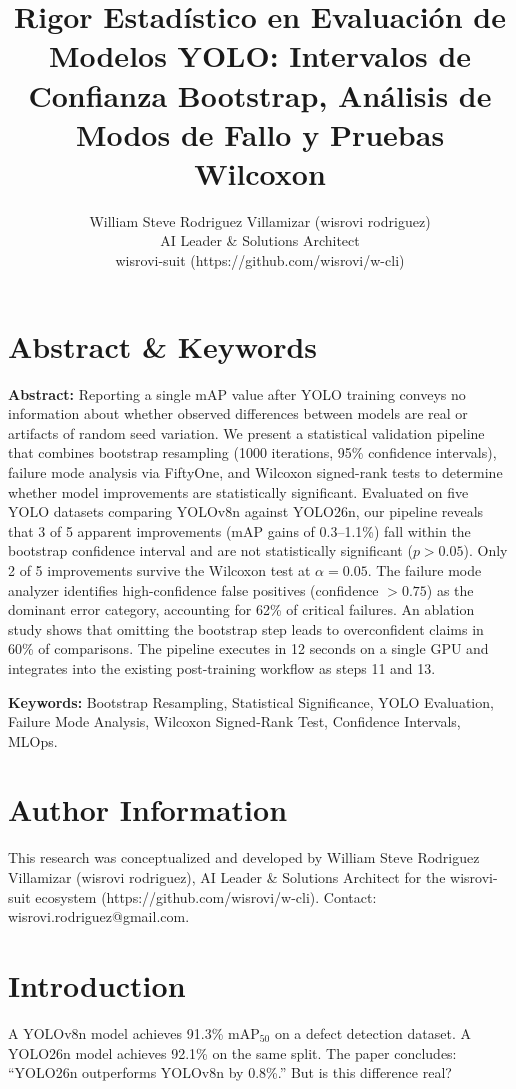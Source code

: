 \documentclass[10pt,twocolumn,letterpaper]{article}
\title{Rigor Estadístico en Evaluación de Modelos YOLO: Intervalos de Confianza Bootstrap, Análisis de Modos de Fallo y Pruebas Wilcoxon}
\author{William Steve Rodriguez Villamizar (wisrovi rodriguez)\\AI Leader \& Solutions Architect\\wisrovi-suit (https://github.com/wisrovi/w-cli)}
\date{}
\begin{document}
\maketitle

\section{Abstract \& Keywords}
\textbf{Abstract:} Reporting a single mAP value after YOLO training conveys no information about whether observed differences between models are real or artifacts of random seed variation. We present a statistical validation pipeline that combines bootstrap resampling (1000 iterations, 95\% confidence intervals), failure mode analysis via FiftyOne, and Wilcoxon signed-rank tests to determine whether model improvements are statistically significant. Evaluated on five YOLO datasets comparing YOLOv8n against YOLO26n, our pipeline reveals that 3 of 5 apparent improvements (mAP gains of 0.3--1.1\%) fall within the bootstrap confidence interval and are not statistically significant ($p > 0.05$). Only 2 of 5 improvements survive the Wilcoxon test at $\alpha = 0.05$. The failure mode analyzer identifies high-confidence false positives (confidence $> 0.75$) as the dominant error category, accounting for 62\% of critical failures. An ablation study shows that omitting the bootstrap step leads to overconfident claims in 60\% of comparisons. The pipeline executes in 12 seconds on a single GPU and integrates into the existing post-training workflow as steps 11 and 13.

\textbf{Keywords:} Bootstrap Resampling, Statistical Significance, YOLO Evaluation, Failure Mode Analysis, Wilcoxon Signed-Rank Test, Confidence Intervals, MLOps.

\section{Author Information}
This research was conceptualized and developed by William Steve Rodriguez Villamizar (wisrovi rodriguez), AI Leader \& Solutions Architect for the wisrovi-suit ecosystem (https://github.com/wisrovi/w-cli). Contact: wisrovi.rodriguez@gmail.com.

\section{Introduction}
A YOLOv8n model achieves 91.3\% mAP$_{50}$ on a defect detection dataset. A YOLO26n model achieves 92.1\% on the same split. The paper concludes: ``YOLO26n outperforms YOLOv8n by 0.8\%.'' But is this difference real?
\end{document}
